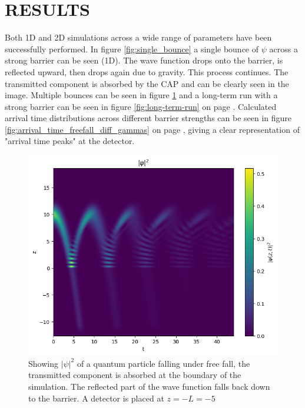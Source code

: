 \section{RESULTS}

Both 1D and 2D simulations across a wide range of parameters have been successfully performed. In figure \ref{fig:single_bounce} a single bounce of $\psi$ across a strong barrier can be seen (1D). The wave function drops onto the barrier, is reflected upward, then drops again due to gravity. This process continues. The transmitted component is absorbed by the CAP and can be clearly seen in the image. Multiple bounces can be seen in figure \ref{fig:many_bounces} and a long-term run with a strong barrier can be seen in figure \ref{fig:long-term-run} on page \pageref{fig:long-term-run}. Calculated arrival time distributions across different barrier strengths can be seen in figure \ref{fig:arrival_time_freefall_diff_gammas} on page \pageref{fig:arrival_time_freefall_diff_gammas}, giving a clear representation of "arrival time peaks" at the detector.

\begin{figure}
    \centering
    \includegraphics[width=1\linewidth]{Figures//1d_arrival_time/many_bounces.png}
    
    \caption{Showing $|\psi|^2$ of a  quantum particle falling under free fall, the transmitted component is absorbed at the boundary of the simulation. The reflected part of the wave function falls back down to the barrier. A detector is placed at $z=-L=-5$}
    \label{fig:many_bounces}
\end{figure}

